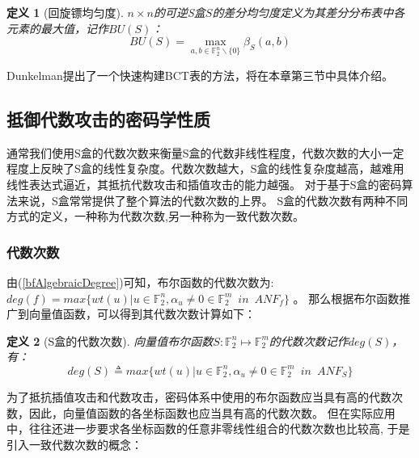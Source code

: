 \documentclass{xduugthesis}
\newtheorem{definition}{定义}
\begin{document}
\begin{definition}[回旋镖均匀度]
    $n\times n$的可逆S盒$S$的差分均匀度定义为其差分分布表中各元素的最大值，记作$BU(S)$：
    \begin{equation}
        BU(S) = \mathop{max}\limits_{a,b \in \mathbb{F}_2^n \backslash \{ 0\} } \beta_S(a,b)
    \end{equation}
\end{definition}\par
Dunkelman\cite{DBLP:journals/iacr/Dunkelman18}提出了一个快速构建BCT表的方法，将在本章第三节中具体介绍。

\subsection{抵御代数攻击的密码学性质}
通常我们使用S盒的代数次数来衡量S盒的代数非线性程度，代数次数的大小一定程度上反映了S盒的线性复杂度。代数次数越大，S盒的线性复杂度越高，越难用线性表达式逼近\cite{刘景伟2003rijndael}，其抵抗代数攻击和插值攻击的能力越强。
对于基于S盒的密码算法来说，S盒常常提供了整个算法的代数次数的上界。
S盒的代数次数有两种不同方式的定义，一种称为代数次数,另一种称为一致代数次数。\par
\subsubsection{代数次数}
由(\ref{bfAlgebraicDegree})可知，布尔函数的代数次数为:
$deg(f) = max\{wt(u)|u\in \mathbb{F}_2^n,\alpha_u \ne 0 \in \mathbb{F}_2^m \enspace in \enspace ANF_f \}$ 。
那么根据布尔函数推广到向量值函数，可以得到其代数次数计算如下：
\begin{definition}[S盒的代数次数]
    向量值布尔函数$S:\mathbb{F}_2^n \mapsto \mathbb{F}_2^m$的代数次数记作$deg(S)$，有：
    \begin{equation}
        deg(S) \triangleq max\{wt(u)|u\in \mathbb{F}_2^n,\alpha_u \ne 0 \in \mathbb{F}_2^m \enspace in \enspace ANF_S \}
    \end{equation}
\end{definition}\par
为了抵抗插值攻击和代数攻击，密码体系中使用的布尔函数应当具有高的代数次数，因此，向量值函数的各坐标函数也应当具有高的代数次数。
但在实际应用中，往往还进一步要求各坐标函数的任意非零线性组合的代数次数也比较高, 于是引入一致代数次数的概念：
    
\end{document}
